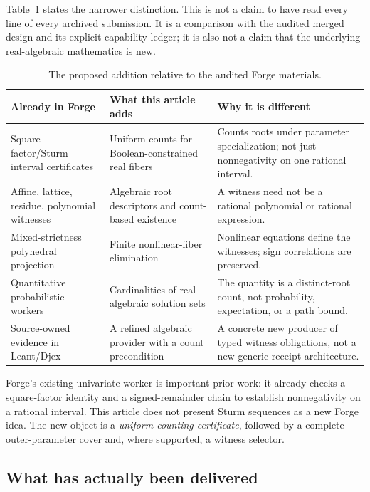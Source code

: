 Table~\ref{tab:delta} states the narrower distinction. This is not a claim to have read every line of every archived submission. It is a comparison with the audited merged design and its explicit capability ledger; it is also not a claim that the underlying real-algebraic mathematics is new.

\begin{table}[ht]
\centering\small
\begin{tabularx}{\textwidth}{@{}p{}XX@{}}
\toprule
Already in Forge & What this article adds & Why it is different\\
\midrule
Square-factor/Sturm interval certificates & Uniform counts for Boolean-constrained real fibers & Counts roots under parameter specialization; not just nonnegativity on one rational interval.\\
Affine, lattice, residue, polynomial witnesses & Algebraic root descriptors and count-based existence & A witness need not be a rational polynomial or rational expression.\\
Mixed-strictness polyhedral projection & Finite nonlinear-fiber elimination & Nonlinear equations define the witnesses; sign correlations are preserved.\\
Quantitative probabilistic workers & Cardinalities of real algebraic solution sets & The quantity is a distinct-root count, not probability, expectation, or a path bound.\\
Source-owned evidence in Leant/Djex & A refined algebraic provider with a count precondition & A concrete new producer of typed witness obligations, not a new generic receipt architecture.\\
\bottomrule
\end{tabularx}
\caption{The proposed addition relative to the audited Forge materials.}\label{tab:delta}
\end{table}

Forge's existing univariate worker is important prior work: it already checks a square-factor identity and a signed-remainder chain to establish nonnegativity on a rational interval. This article does not present Sturm sequences as a new Forge idea. The new object is a \emph{uniform counting certificate}, followed by a complete outer-parameter cover and, where supported, a witness selector.

\subsection{What has actually been delivered}

